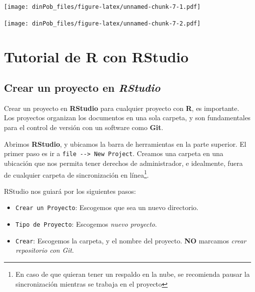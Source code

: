 \documentclass[12pt,letterpaper,]{book}
\newenvironment{Shaded}{\begin{snugshade}}{\end{snugshade}}
\newcommand{\KeywordTok}[1]{\textcolor[rgb]{0.13,0.29,0.53}{\textbf{#1}}}
\newcommand{\DataTypeTok}[1]{\textcolor[rgb]{0.13,0.29,0.53}{#1}}
\newcommand{\StringTok}[1]{\textcolor[rgb]{0.31,0.60,0.02}{#1}}
\newcommand{\OperatorTok}[1]{\textcolor[rgb]{0.81,0.36,0.00}{\textbf{#1}}}
\newcommand{\NormalTok}[1]{#1}
\let\rmarkdownfootnote\footnote%
\def\footnote{\protect\rmarkdownfootnote}
\begin{document}
\texttt{[image: dinPob\_files/figure-latex/unnamed-chunk-7-1.pdf]}

\begin{Shaded}
\end{Shaded}

\texttt{[image: dinPob\_files/figure-latex/unnamed-chunk-7-2.pdf]}

\chapter{Tutorial de R con RStudio}\label{tutorial-de-r-con-rstudio}

\section{\texorpdfstring{Crear un proyecto en
\emph{RStudio}}{Crear un proyecto en RStudio}}\label{RStudioProject}

Crear un proyecto en \textbf{RStudio} para cualquier proyecto con
\textbf{R}, es importante. Los proyectos organizan los documentos en una
sola carpeta, y son fundamentales para el control de versión con un
software como \textbf{Git}.

Abrimos \textbf{RStudio}, y ubicamos la barra de herramientas en la
parte superior. El primer paso es ir a
\texttt{file\ -\/-\textgreater{}\ New\ Project}. Creamos una carpeta en
una ubicación que nos permita tener derechos de administrador, e
idealmente, fuera de cualquier carpeta de sincronización en
línea\footnote{En caso de que quieran tener un respaldo en la nube, se recomienda pausar la sincronización mientras se trabaja en el proyecto}.

RStudio nos guiará por los siguientes pasos:

\begin{itemize}
\item
  \texttt{Crear\ un\ Proyecto}: Escogemos que sea un nuevo directorio.
\item
  \texttt{Tipo\ de\ Proyecto}: Escogemos \emph{nuevo proyecto}.
\item
  \texttt{Crear}: Escogemos la carpeta, y el nombre del proyecto.
  \textbf{NO} marcamos \emph{crear repositorio con Git}.
\end{itemize}
\end{document}
